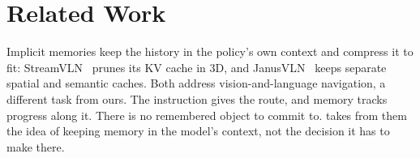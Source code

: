 \section{Related Work}
\label{sec:related}

Implicit memories keep the history in the policy's own context and compress it
to fit: StreamVLN~\cite{streamvln} prunes its KV cache in 3D, and
JanusVLN~\cite{janusvln} keeps separate spatial and semantic caches. Both
address vision-and-language navigation, a different task from ours. The
instruction gives the route, and memory tracks progress along it. There is no
remembered object to commit to. \ours{} takes from them the idea of keeping
memory in the model's context, not the decision it has to make there.
